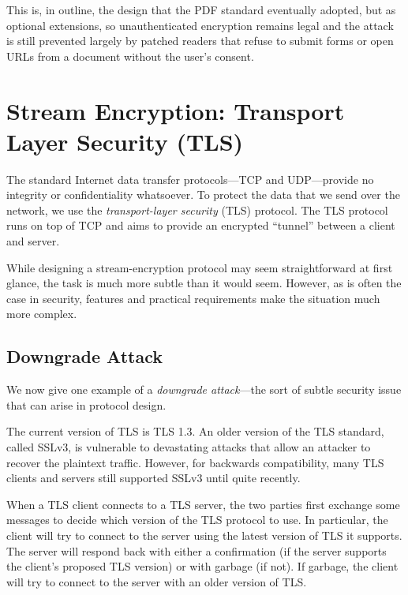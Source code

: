 \documentclass[
  letterpaper,
]{scrbook}
\theoremstyle{definition}
\theoremstyle{plain}
\theoremstyle{plain}
\theoremstyle{remark}
\begin{document}
This is, in outline, the design that the PDF standard eventually
adopted, but as optional extensions, so unauthenticated encryption
remains legal and the attack is still prevented largely by patched
readers that refuse to submit forms or open URLs from a document without
the user's consent.

\section{Stream Encryption: Transport Layer Security
(TLS)}\label{stream-encryption-transport-layer-security-tls}

The standard Internet data transfer protocols---TCP and UDP---provide no
integrity or confidentiality whatsoever. To protect the data that we
send over the network, we use the \emph{transport-layer security} (TLS)
protocol. The TLS protocol runs on top of TCP and aims to provide an
encrypted ``tunnel'' between a client and server.


While designing a stream-encryption protocol may seem straightforward at
first glance, the task is much more subtle than it would seem. However,
as is often the case in security, features and practical requirements
make the situation much more complex.

\subsection{Downgrade Attack}\label{downgrade-attack}

We now give one example of a \emph{downgrade attack}---the sort of
subtle security issue that can arise in protocol design.

The current version of TLS is TLS 1.3. An older version of the TLS
standard, called SSLv3, is vulnerable to devastating attacks that allow
an attacker to recover the plaintext traffic. However, for backwards
compatibility, many TLS clients and servers still supported SSLv3 until
quite recently.

When a TLS client connects to a TLS server, the two parties first
exchange some messages to decide which version of the TLS protocol to
use. In particular, the client will try to connect to the server using
the latest version of TLS it supports. The server will respond back with
either a confirmation (if the server supports the client's proposed TLS
version) or with garbage (if not). If garbage, the client will try to
connect to the server with an older version of TLS.
\end{document}
